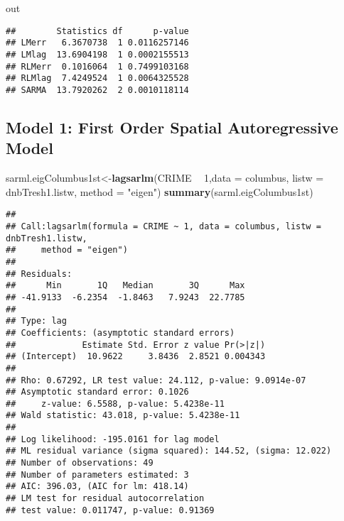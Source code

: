 \documentclass[
]{book}
\newenvironment{Shaded}{\begin{snugshade}}{\end{snugshade}}
\newcommand{\DataTypeTok}[1]{\textcolor[rgb]{0.13,0.29,0.53}{#1}}
\newcommand{\DecValTok}[1]{\textcolor[rgb]{0.00,0.00,0.81}{#1}}
\newcommand{\KeywordTok}[1]{\textcolor[rgb]{0.13,0.29,0.53}{\textbf{#1}}}
\newcommand{\NormalTok}[1]{#1}
\newcommand{\OperatorTok}[1]{\textcolor[rgb]{0.81,0.36,0.00}{\textbf{#1}}}
\newcommand{\StringTok}[1]{\textcolor[rgb]{0.31,0.60,0.02}{#1}}
\begin{document}
\begin{Shaded}
\begin{Highlighting}[]
\NormalTok{out}
\end{Highlighting}
\end{Shaded}

\begin{verbatim}
##        Statistics df      p-value
## LMerr   6.3670738  1 0.0116257146
## LMlag  13.6904198  1 0.0002155513
## RLMerr  0.1016064  1 0.7499103168
## RLMlag  7.4249524  1 0.0064325528
## SARMA  13.7920262  2 0.0010118114
\end{verbatim}

\hypertarget{model-1-first-order-spatial-autoregressive-model}{%
\subsection{Model 1: First Order Spatial Autoregressive Model}\label{model-1-first-order-spatial-autoregressive-model}}

\begin{Shaded}
\begin{Highlighting}[]
\NormalTok{sarml.eigColumbus1st<-}\KeywordTok{lagsarlm}\NormalTok{(CRIME }\OperatorTok{~}\StringTok{ }\DecValTok{1}\NormalTok{,}\DataTypeTok{data =}\NormalTok{ columbus, }
                            \DataTypeTok{listw =}\NormalTok{ dnbTresh1.listw, }\DataTypeTok{method =} \StringTok{"eigen"}\NormalTok{)}
\KeywordTok{summary}\NormalTok{(sarml.eigColumbus1st)}
\end{Highlighting}
\end{Shaded}

\begin{verbatim}
## 
## Call:lagsarlm(formula = CRIME ~ 1, data = columbus, listw = dnbTresh1.listw, 
##     method = "eigen")
## 
## Residuals:
##      Min       1Q   Median       3Q      Max 
## -41.9133  -6.2354  -1.8463   7.9243  22.7785 
## 
## Type: lag 
## Coefficients: (asymptotic standard errors) 
##             Estimate Std. Error z value Pr(>|z|)
## (Intercept)  10.9622     3.8436  2.8521 0.004343
## 
## Rho: 0.67292, LR test value: 24.112, p-value: 9.0914e-07
## Asymptotic standard error: 0.1026
##     z-value: 6.5588, p-value: 5.4238e-11
## Wald statistic: 43.018, p-value: 5.4238e-11
## 
## Log likelihood: -195.0161 for lag model
## ML residual variance (sigma squared): 144.52, (sigma: 12.022)
## Number of observations: 49 
## Number of parameters estimated: 3 
## AIC: 396.03, (AIC for lm: 418.14)
## LM test for residual autocorrelation
## test value: 0.011747, p-value: 0.91369
\end{verbatim}
\end{document}
